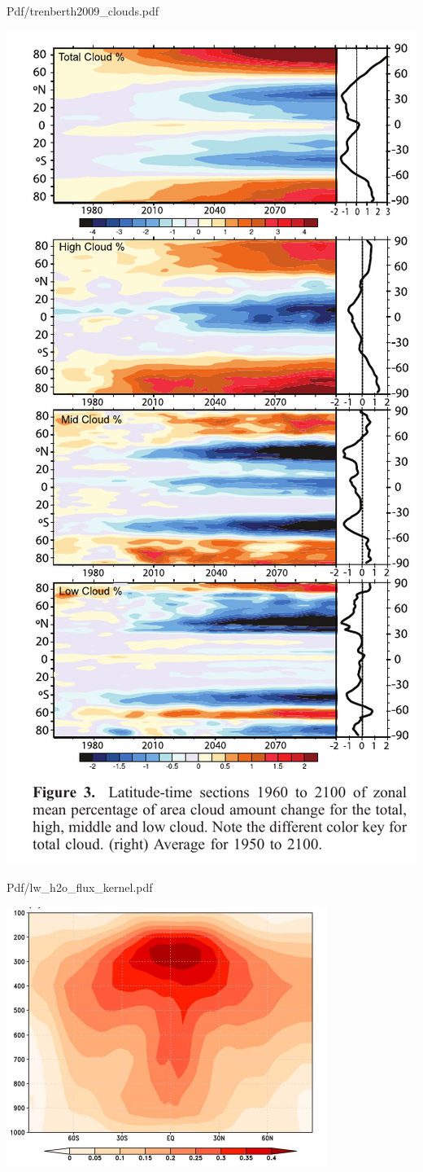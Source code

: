 \documentclass[presentation]{beamer}
\begin{document}
\begin{frame}[label={sec:org013b470}]{Pdf/trenberth2009\_clouds.pdf}
\begin{center}
\includegraphics[width=0.7\linewidth]{./Figs/Pdf/trenberth2009_clouds.pdf}
\end{center}
\end{frame}

\begin{frame}[label={sec:org5555463}]{Pdf/lw\_h2o\_flux\_kernel.pdf}
\begin{center}
\includegraphics[width=0.7\linewidth]{./Figs/Pdf/lw_h2o_flux_kernel.pdf}
\end{center}
\end{frame}
\end{document}
